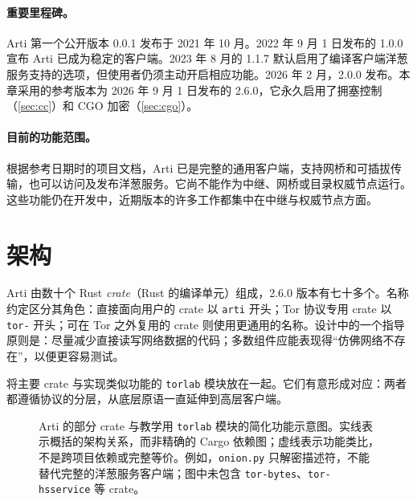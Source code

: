 \paragraph{重要里程碑。}Arti 第一个公开版本 0.0.1 发布于 2021 年 10 月。2022 年 9 月 1 日发布的 1.0.0 宣布 Arti 已成为稳定的客户端。2023 年 8 月的 1.1.7 默认启用了编译客户端洋葱服务支持的选项，但使用者仍须主动开启相应功能。2026 年 2 月，2.0.0 发布。本章采用的参考版本为 2026 年 9 月 1 日发布的 2.6.0，它永久启用了拥塞控制（\cref{sec:cc}）和 CGO 加密（\cref{sec:cgo}）。

\paragraph{目前的功能范围。}根据参考日期时的项目文档，Arti 已是完整的通用客户端，支持网桥和可插拔传输，也可以访问及发布洋葱服务。它尚不能作为中继、网桥或目录权威节点运行。这些功能仍在开发中，近期版本的许多工作都集中在中继与权威节点方面。

\section{架构}\label{sec:arti-architettura}

Arti 由数十个 Rust \emph{crate}（Rust 的编译单元）组成，2.6.0 版本有七十多个。名称约定区分其角色：直接面向用户的 crate 以 \texttt{arti} 开头；Tor 协议专用 crate 以 \texttt{tor-} 开头；可在 Tor 之外复用的 crate 则使用更通用的名称。设计中的一个指导原则是：尽量减少直接读写网络数据的代码；多数组件应能表现得\enquote{仿佛网络不存在}，以便更容易测试。

 将主要 crate 与实现类似功能的 \texttt{torlab} 模块放在一起。它们有意形成对应：两者都遵循协议的分层，从底层原语一直延伸到高层客户端。

\begin{figure}[htbp]
\centering

\caption{Arti 的部分 crate 与教学用 \texttt{torlab} 模块的简化功能示意图。实线表示概括的架构关系，而非精确的 Cargo 依赖图；虚线表示功能类比，不是跨项目依赖或完整等价。例如，\texttt{onion.py} 只解密描述符，不能替代完整的洋葱服务客户端；图中未包含 \texttt{tor-bytes}、\texttt{tor-hsservice} 等 crate。}
\label{fig:crate}
\end{figure}

